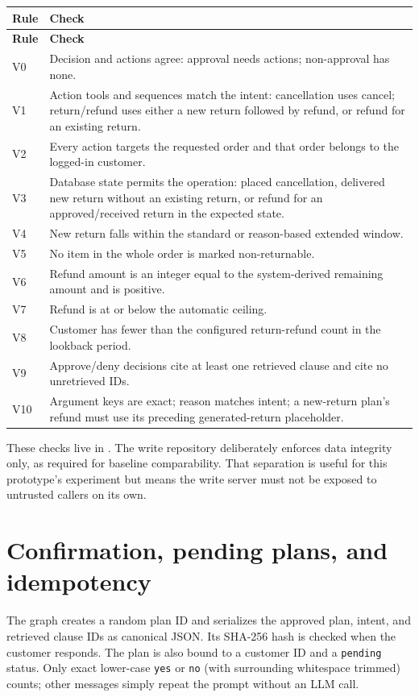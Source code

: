 \documentclass[11pt,a4paper]{article}
\begin{document}
\begin{longtable}{p{}p{}}
\toprule
\textbf{Rule} & \textbf{Check} \\
\midrule
\endfirsthead
\toprule
\textbf{Rule} & \textbf{Check} \\
\midrule
\endhead
V0 & Decision and actions agree: approval needs actions; non-approval has none. \\
V1 & Action tools and sequences match the intent: cancellation uses cancel; return/refund uses either a new return followed by refund, or refund for an existing return. \\
V2 & Every action targets the requested order and that order belongs to the logged-in customer. \\
V3 & Database state permits the operation: placed cancellation, delivered new return without an existing return, or refund for an approved/received return in the expected state. \\
V4 & New return falls within the standard or reason-based extended window. \\
V5 & No item in the whole order is marked non-returnable. \\
V6 & Refund amount is an integer equal to the system-derived remaining amount and is positive. \\
V7 & Refund is at or below the automatic ceiling. \\
V8 & Customer has fewer than the configured return-refund count in the lookback period. \\
V9 & Approve/deny decisions cite at least one retrieved clause and cite no unretrieved IDs. \\
V10 & Argument keys are exact; reason matches intent; a new-return plan's refund must use its preceding generated-return placeholder. \\
\bottomrule
\end{longtable}

These checks live in . The write repository deliberately enforces data integrity only, as required for baseline comparability. That separation is useful for this prototype's experiment but means the write server must not be exposed to untrusted callers on its own.

\section{Confirmation, pending plans, and idempotency}

The graph creates a random plan ID and serializes the approved plan, intent, and retrieved clause IDs as canonical JSON. Its SHA-256 hash is checked when the customer responds. The plan is also bound to a customer ID and a \texttt{pending} status. Only exact lower-case \texttt{yes} or \texttt{no} (with surrounding whitespace trimmed) counts; other messages simply repeat the prompt without an LLM call.
\end{document}
